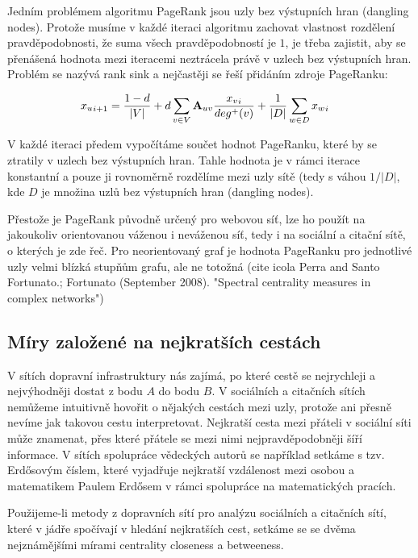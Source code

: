 \documentclass[12pt,titlepage]{report}
\begin{document}
Jedním problémem algoritmu PageRank jsou uzly bez výstupních hran (dangling
nodes). Protože musíme v každé iteraci algoritmu zachovat vlastnost rozdělení
pravděpodobnosti, že suma všech pravděpodobností je $1$, je třeba zajistit, aby
se přenášená hodnota mezi iteracemi neztrácela právě v uzlech bez výstupních
hran. Problém se nazývá rank sink a nejčastěji se řeší přidáním zdroje
PageRanku:

\begin{align}
{x_u}_{i + 1} &= \frac{1 - d}{|V|} + d \displaystyle\sum_{v \in V} {\bf A}_{uv} \frac{{x_v}_i}{deg^+ (v)} + \frac{1}{|D|} \displaystyle\sum_{w \in D} {x_w}_i
\end{align}

V každé iteraci předem vypočítáme součet hodnot PageRanku, které by se ztratily
v uzlech bez výstupních hran. Tahle hodnota je v rámci iterace konstantní a
pouze ji rovnoměrně rozdělíme mezi uzly sítě (tedy s váhou $1/|D|$, kde $D$ je
množina uzlů bez výstupních hran (dangling nodes).

Přestože je PageRank původně určený pro webovou síť, lze ho použít na
jakoukoliv orientovanou váženou i neváženou síť, tedy i na sociální a citační
sítě, o kterých je zde řeč. Pro neorientovaný graf je hodnota PageRanku pro
jednotlivé uzly velmi blízká stupňům grafu, ale ne totožná (cite icola Perra
and Santo Fortunato.; Fortunato (September 2008). "Spectral centrality measures
in complex networks")

\subsection{Míry založené na nejkratších cestách}
V sítích dopravní infrastruktury nás zajímá, po které cestě se nejrychleji a
nejvýhodněji dostat z bodu $A$ do bodu $B$. V sociálních a citačních sítích
nemůžeme intuitivně hovořit o nějakých cestách mezi uzly, protože ani přesně
nevíme jak takovou cestu interpretovat. Nejkratší cesta mezi přáteli v sociální
síti může znamenat, přes které přátele se mezi nimi nejpravděpodobněji šíří
informace. V sítích spolupráce vědeckých autorů se například setkáme s tzv.
Erdősovým číslem, které vyjadřuje nejkratší vzdálenost mezi osobou a
matematikem Paulem Erdősem v rámci spolupráce na matematických pracích.

Použijeme-li metody z dopravních sítí pro analýzu sociálních a citačních sítí,
které v jádře spočívají v hledání nejkratších cest, setkáme se se dvěma
nejznámějšími mírami centrality closeness a betweeness.
\end{document}
